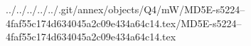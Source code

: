 ../../../../../.git/annex/objects/Q4/mW/MD5E-s5224--4faf55c174d634045a2c09e434a64c14.tex/MD5E-s5224--4faf55c174d634045a2c09e434a64c14.tex